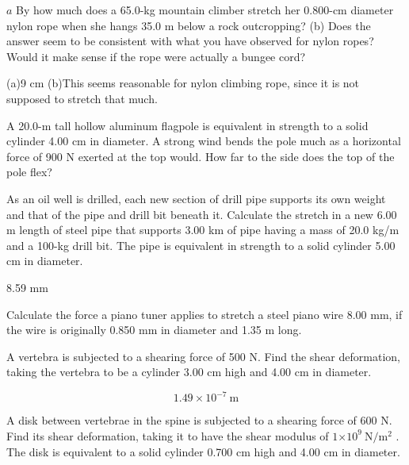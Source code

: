 \documentclass[
]{book}
\newenvironment{problems-exercises}{}{}
\begin{document}
\begin{problems-exercises}
\hypertarget{fs-id1165298598606}{}
\leavevmode\hypertarget{fs-id1165298598607}{}%
\(a\) By how much does a 65.0-kg mountain climber stretch her 0.800-cm
diameter nylon rope when she hangs 35.0 m below a rock outcropping? (b)
Does the answer seem to be consistent with what you have observed for
nylon ropes? Would it make sense if the rope were actually a bungee
cord?

\leavevmode\hypertarget{fs-id1165298944074}{}%
(a)9 cm {\hfill\break
} (b)This seems reasonable for nylon climbing rope,
since it is not supposed to stretch that much.

\hypertarget{fs-id1165298937277}{}
\leavevmode\hypertarget{fs-id1165298937278}{}%
A 20.0-m tall hollow aluminum flagpole is equivalent in strength to a
solid cylinder 4.00 cm in diameter. A strong wind bends the pole much as
a horizontal force of 900 N exerted at the top would. How far to the
side does the top of the pole flex?

\hypertarget{fs-id1165296239036}{}
\leavevmode\hypertarget{fs-id1165296239037}{}%
As an oil well is drilled, each new section of drill pipe supports its
own weight and that of the pipe and drill bit beneath it. Calculate the
stretch in a new 6.00 m length of steel pipe that supports 3.00 km of
pipe having a mass of 20.0 kg/m and a 100-kg drill bit. The pipe is
equivalent in strength to a solid cylinder 5.00 cm in diameter.

\leavevmode\hypertarget{fs-id1165298608719}{}%
8.59 mm

\hypertarget{fs-id1165298786214}{}
\leavevmode\hypertarget{fs-id1165298786215}{}%
Calculate the force a piano tuner applies to stretch a steel piano wire
8.00 mm, if the wire is originally 0.850 mm in diameter and 1.35 m long.

\hypertarget{fs-id1165298982360}{}
\leavevmode\hypertarget{fs-id1165298982361}{}%
A vertebra is subjected to a shearing force of 500 N. Find the shear
deformation, taking the vertebra to be a cylinder 3.00 cm high and 4.00
cm in diameter.

\hypertarget{fs-id1165298858039}{}
\leavevmode\hypertarget{eip-id1373472}{}%
\[{1\text{.}{\text{49} \times \text{10}^{- 7}}\ \text{m}}{}\]

\hypertarget{fs-id1165298797862}{}
\leavevmode\hypertarget{fs-id1165298797863}{}%
A disk between vertebrae in the spine is subjected to a shearing force
of 600 N. Find its shear deformation, taking it to have the shear
modulus of \({1{\times \text{10}^{9}}{\ \text{N}/\text{m}^{2}}}{}\) . The
disk is equivalent to a solid cylinder 0.700 cm high and 4.00 cm in
diameter.


\end{problems-exercises}
\end{document}
